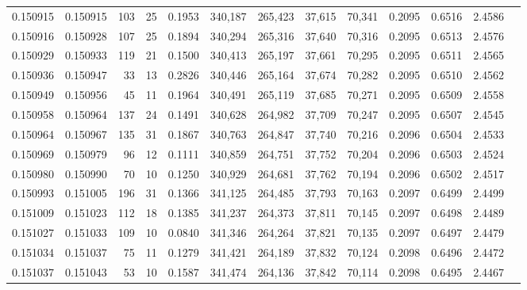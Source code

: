\begin{tabular}{rrrrrrrrrrrrr}
0.150915 & 0.150915 &   103 &  25 &                                     0.1953 & 340,187 & 265,423 &  37,615 &  70,341 & 0.2095 & 0.6516 & 2.4586 \\
0.150916 & 0.150928 &   107 &  25 &                                     0.1894 & 340,294 & 265,316 &  37,640 &  70,316 & 0.2095 & 0.6513 & 2.4576 \\
0.150929 & 0.150933 &   119 &  21 &                                     0.1500 & 340,413 & 265,197 &  37,661 &  70,295 & 0.2095 & 0.6511 & 2.4565 \\
0.150936 & 0.150947 &    33 &  13 &                                     0.2826 & 340,446 & 265,164 &  37,674 &  70,282 & 0.2095 & 0.6510 & 2.4562 \\
0.150949 & 0.150956 &    45 &  11 &                                     0.1964 & 340,491 & 265,119 &  37,685 &  70,271 & 0.2095 & 0.6509 & 2.4558 \\
0.150958 & 0.150964 &   137 &  24 &                                     0.1491 & 340,628 & 264,982 &  37,709 &  70,247 & 0.2095 & 0.6507 & 2.4545 \\
0.150964 & 0.150967 &   135 &  31 &                                     0.1867 & 340,763 & 264,847 &  37,740 &  70,216 & 0.2096 & 0.6504 & 2.4533 \\
0.150969 & 0.150979 &    96 &  12 &                                     0.1111 & 340,859 & 264,751 &  37,752 &  70,204 & 0.2096 & 0.6503 & 2.4524 \\
0.150980 & 0.150990 &    70 &  10 &                                     0.1250 & 340,929 & 264,681 &  37,762 &  70,194 & 0.2096 & 0.6502 & 2.4517 \\
0.150993 & 0.151005 &   196 &  31 &                                     0.1366 & 341,125 & 264,485 &  37,793 &  70,163 & 0.2097 & 0.6499 & 2.4499 \\
0.151009 & 0.151023 &   112 &  18 &                                     0.1385 & 341,237 & 264,373 &  37,811 &  70,145 & 0.2097 & 0.6498 & 2.4489 \\
0.151027 & 0.151033 &   109 &  10 &                                     0.0840 & 341,346 & 264,264 &  37,821 &  70,135 & 0.2097 & 0.6497 & 2.4479 \\
0.151034 & 0.151037 &    75 &  11 &                                     0.1279 & 341,421 & 264,189 &  37,832 &  70,124 & 0.2098 & 0.6496 & 2.4472 \\
0.151037 & 0.151043 &    53 &  10 &                                     0.1587 & 341,474 & 264,136 &  37,842 &  70,114 & 0.2098 & 0.6495 & 2.4467 \\

\end{tabular}
